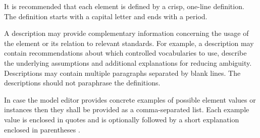 	It is recommended that each element is defined by a crisp, one-line definition. The definition starts with a capital letter and ends with a period.
	
	A description may provide complementary information concerning the usage of the element or its relation to relevant standards. For example, a description may contain recommendations about which controlled vocabularies to use, describe the underlying assumptions and additional explanations for reducing ambiguity. Descriptions may contain multiple paragraphs separated by blank lines. The descriptions should not paraphrase the definitions.
	
	In case the model editor provides concrete examples of possible element values or instances then they shall be provided as a comma-separated list. Each example value is enclosed in quotes and is optionally followed by a short explanation enclosed in parentheses \cite{isaHandbook2015}. 
	